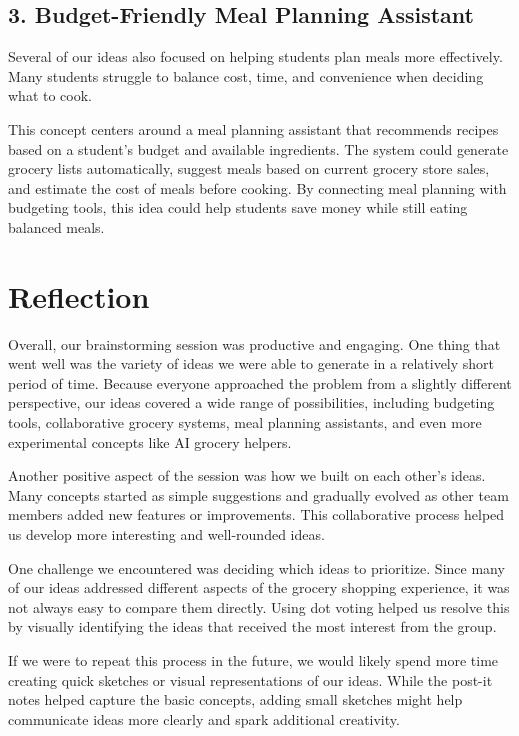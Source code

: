 \documentclass[11pt]{article}
\begin{document}
\subsection*{3. Budget-Friendly Meal Planning Assistant}

Several of our ideas also focused on helping students plan meals more effectively. Many students struggle to balance cost, time, and convenience when deciding what to cook.

This concept centers around a meal planning assistant that recommends recipes based on a student’s budget and available ingredients. The system could generate grocery lists automatically, suggest meals based on current grocery store sales, and estimate the cost of meals before cooking. By connecting meal planning with budgeting tools, this idea could help students save money while still eating balanced meals.

\section*{Reflection}

Overall, our brainstorming session was productive and engaging. One thing that went well was the variety of ideas we were able to generate in a relatively short period of time. Because everyone approached the problem from a slightly different perspective, our ideas covered a wide range of possibilities, including budgeting tools, collaborative grocery systems, meal planning assistants, and even more experimental concepts like AI grocery helpers.

Another positive aspect of the session was how we built on each other’s ideas. Many concepts started as simple suggestions and gradually evolved as other team members added new features or improvements. This collaborative process helped us develop more interesting and well-rounded ideas.

One challenge we encountered was deciding which ideas to prioritize. Since many of our ideas addressed different aspects of the grocery shopping experience, it was not always easy to compare them directly. Using dot voting helped us resolve this by visually identifying the ideas that received the most interest from the group.

If we were to repeat this process in the future, we would likely spend more time creating quick sketches or visual representations of our ideas. While the post-it notes helped capture the basic concepts, adding small sketches might help communicate ideas more clearly and spark additional creativity.
\end{document}
